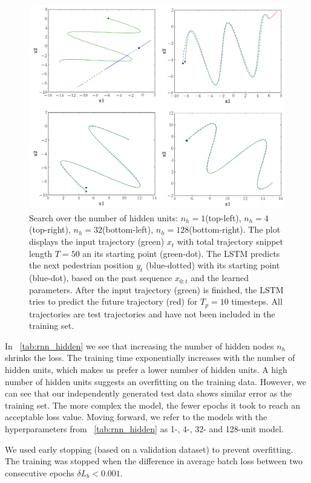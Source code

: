\begin{figure}
	\centering
	\includegraphics [trim=0 0 0 0, clip, angle=0, width=1.0\columnwidth,
	keepaspectratio]{figures/rnn_hidden}
	\caption{Search over the number of hidden units: $n_h=1$(top-left), $n_h=4$(top-right), $n_h=32$(bottom-left), $n_h=128$(bottom-right). The plot displays the input trajectory (green) $x_t$ with total trajectory snippet length $T=50$ an its starting point (green-dot). The LSTM predicts the next pedestrian position $y_t$ (blue-dotted) with its starting point (blue-dot), based on the past sequence $x_{0:t}$ and the learned parameters. After the input trajectory (green) is finished, the LSTM tries to predict the future trajectory (red) for $T_p=10$ timesteps. All trajectories are test trajectories and have not been included in the training set.}
	\label{fig:rnn_hidden}
\end{figure}

In ~\cref{tab:rnn_hidden} we see that increasing the number of hidden nodes $n_h$ shrinks the loss.
The training time exponentially increases with the number of hidden units, which makes us prefer a lower number of hidden units.
A high number of hidden units suggests an overfitting on the training data.
However, we can see that our independently generated test data shows similar error as the training set.
The more complex the model, the fewer epochs it took to reach an acceptable loss value.
Moving forward, we refer to the models with the hyperparameters from ~\cref{tab:rnn_hidden} as 1-, 4-, 32- and 128-unit model.

We used early stopping (based on a validation dataset) to prevent overfitting.
The training was stopped when the difference in average batch loss between two consecutive epochs $\delta L_b < 0.001$.

